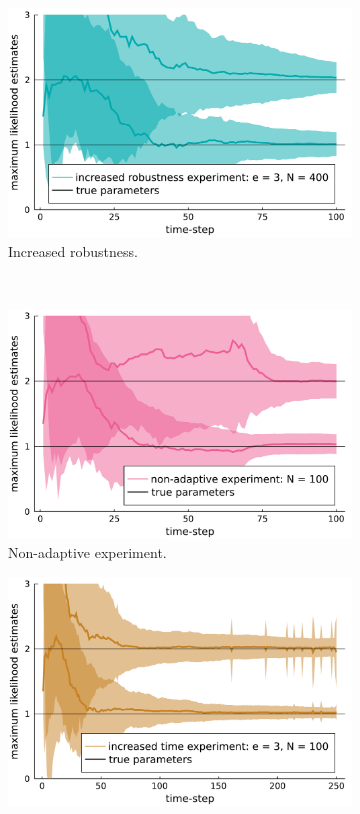\begin{figure}[H]
\begin{subfigure}[b]{0.45\textwidth}
		\includegraphics[width=1.0\textwidth]{figure/paper 3/ensemble online estimate increased robustness}
		\caption{Increased robustness.}
		\label{figEnsembleIncrRob}
	\end{subfigure}\\
	\begin{subfigure}[b]{0.45\textwidth}
		\includegraphics[width=1.0\textwidth]{figure/paper 3/ensemble online estimate non-adaptive}
		\caption{Non-adaptive experiment.}
		\label{figEnsembleNonAdp}
	\end{subfigure}
	\begin{subfigure}[b]{0.45\textwidth}
		\centering
		\includegraphics[width=1.0\textwidth]{figure/paper 3/ensemble online estimate increased time}

\end{subfigure}
\end{figure}
